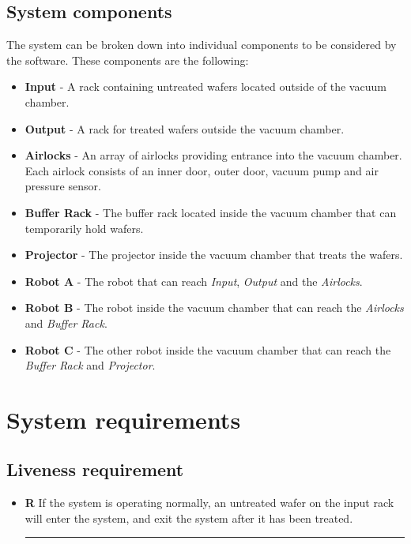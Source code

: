 \documentclass[12pt]{report}
\newcounter{counter}
\begin{document}
	\section{System components}
	The system can be broken down into individual components to be considered by the software. These components are the following:
	\begin{itemize}
	\item \textbf{Input} - A rack containing untreated wafers located outside of the vacuum chamber.
	\item \textbf{Output} - A rack for treated wafers outside the vacuum chamber.
	\item \textbf{Airlocks} - An array of airlocks providing entrance into the vacuum chamber. Each airlock consists of an inner door, outer door, vacuum pump and air pressure sensor.
	\item \textbf{Buffer Rack} - The buffer rack located inside the vacuum chamber that can temporarily hold wafers.
	\item \textbf{Projector} - The projector inside the vacuum chamber that treats the wafers.
	\item \textbf{Robot A} - The robot that can reach \emph{Input}, \emph{Output} and the \emph{Airlocks}.
	\item \textbf{Robot B} - The robot inside the vacuum chamber that can reach the \emph{Airlocks} and \emph{Buffer Rack}.
	\item \textbf{Robot C} - The other robot inside the vacuum chamber that can reach the \emph{Buffer Rack} and \emph{Projector}.
	\end{itemize}
	
	\chapter{System requirements}
	
	\newcommand{\req}[1]{
		\item[\textbf{R\stepcounter{counter}\arabic{counter}}] {#1}
		\hrule
	}
	
	\newcommand{\reqb}[2]{
		\item[\textbf{{#1}}] {#2}
		\hrule
	}
	
	\section{Liveness requirement}
	\begin{itemize}
		\req{If the system is operating normally, an untreated wafer on the input rack will enter the system, and exit the system after it has been treated.}
	\end{itemize}
	
\end{document}
